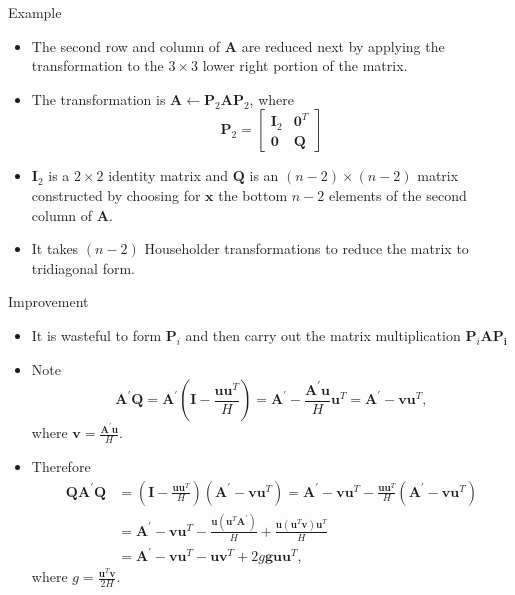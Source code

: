 \documentclass{beamer}
\begin{document}
\begin{frame}{Example}
    \begin{itemize}
        \item The second row and column of $\mathbf{A}$ are reduced next by applying the transformation to
        the $3\times 3$ lower right portion of the matrix. 
        \item The transformation is $\mathbf{A} \leftarrow \mathbf{P}_2 \mathbf{A} \mathbf{P}_2$,  where 
        \[
            \mathbf{P}_2=\left[\begin{array}{ll}
                \mathbf{I}_2 & \mathbf{0}^T \\
                \mathbf{0} & \mathbf{Q}
                \end{array}\right]
        \]
        \item $\mathbf{I}_2$ is a $2 \times 2$ identity matrix and $\mathbf{Q}$ is an 
         $(n-2) \times(n-2)$ matrix constructed by choosing for $\mathbf{x}$ the bottom $n-2$ elements of the second column of $\mathbf{A}$. 
        \item It takes $(n-2)$ Householder transformations to reduce the matrix to tridiagonal form. 
    \end{itemize}
\end{frame}
\begin{frame}{Improvement}
    \begin{itemize}
        \item It is wasteful to form $\mathbf{P}_i$ and 
        then carry out the matrix multiplication $\mathbf{P}_i \mathbf{A P _ { i }}$
        \item Note 
        \[
        \mathbf{A}^{\prime} \mathbf{Q}=\mathbf{A}^{\prime}\left(\mathbf{I}-\frac{\mathbf{u u}^T}{H}\right)
        =\mathbf{A}^{\prime}-\frac{\mathbf{A}^{\prime} \mathbf{u}}{H} \mathbf{u}^T
        =\mathbf{A}^{\prime}-\mathbf{v} \mathbf{u}^T,
        \]
        where $\mathbf{v}=\frac{\mathbf{A}^{\prime} \mathbf{u}}{H}$.
        \item Therefore 
        \begin{align*}
            \mathbf{Q} \mathbf{A}^{\prime} \mathbf{Q} & =\left(\mathbf{I}-\frac{\mathbf{u} \mathbf{u}^T}{H}\right)\left(\mathbf{A}^{\prime}-\mathbf{v} \mathbf{u}^T\right)=\mathbf{A}^{\prime}-\mathbf{v} \mathbf{u}^T-\frac{\mathbf{u} \mathbf{u}^T}{H}\left(\mathbf{A}^{\prime}-\mathbf{v} \mathbf{u}^T\right) \\
            & =\mathbf{A}^{\prime}-\mathbf{v} \mathbf{u}^T-\frac{\mathbf{u}\left(\mathbf{u}^T \mathbf{A}^{\prime}\right)}{H}+\frac{\mathbf{u}\left(\mathbf{u}^T \mathbf{v}\right) \mathbf{u}^T}{H} \\
            & =\mathbf{A}^{\prime}-\mathbf{v} \mathbf{u}^T-\mathbf{u} \mathbf{v}^T+2 g \mathbf{g u} \mathbf{u}^T,
        \end{align*}
        where $g=\frac{\mathbf{u}^T \mathbf{v}}{2 H}$.
    \end{itemize}
\end{frame}
\end{document}
